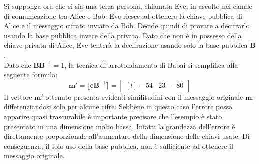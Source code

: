 \begin{exmp}
\[\]
Si supponga ora che ci sia una terza persona, chiamata Eve, in ascolto nel canale di 
comunicazione tra Alice e Bob. Eve riesce ad ottenere la chiave pubblica di Alice e il 
messaggio cifrato inviato da Bob. Decide quindi di provare a decifrarlo usando la base 
pubblica invece della privata. 
Dato che non è in possesso della chiave privata di Alice, Eve tenterà la 
decifrazione usando solo la base pubblica $\mathbf{B}$. 
\\
Dato che $\mathbf{B}\mathbf{B}^{-1} = 1$, la tecnica di arrotondamento di Babai  si semplifica 
alla seguente formula:
\[
    \mathbf{m}' = \lfloor \mathbf{c}\mathbf{B}^{-1}\rceil = 
    \begin{bmatrix*}[l]
        -54 & 23 & -80
    \end{bmatrix*}
\]
Il vettore $\mathbf{m}'$ ottenuto presenta evidenti similitudini con il messaggio originale 
$\mathbf{m}$, differenziandosi solo per alcune cifre. 
Sebbene in questo caso l'errore possa apparire quasi trascurabile è importante precisare
che l'esempio è stato presentato in una dimensione molto bassa. Infatti la grandezza dell'errore
è direttamente proporzionale all'aumentare della dimensione delle chiavi usate. 
Di conseguenza, il solo uso della base pubblica, non è sufficiente ad ottenere il messaggio
originale.
\end{exmp}
